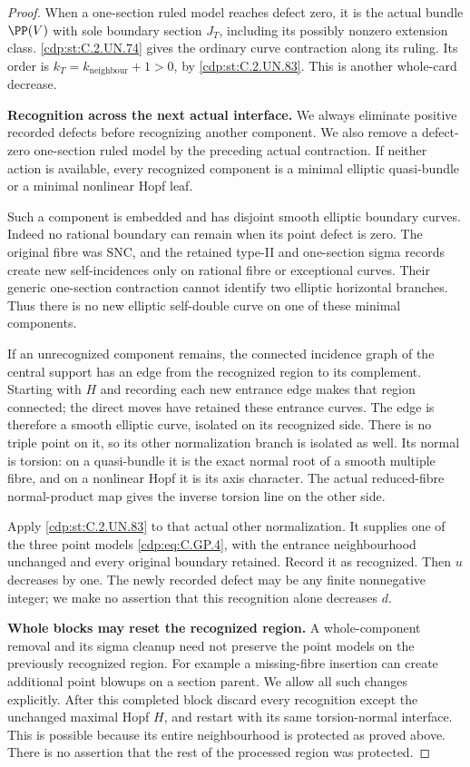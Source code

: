 \begin{proof}
When a one-section ruled model reaches defect
zero, it is the actual bundle \(\PP(V)\)
with sole boundary section \(J_T\), including
its possibly nonzero extension class. \ref{cdp:st:C.2.UN.74}
gives the ordinary curve contraction along
its ruling. Its order is
\(k_T=k_{\mathrm{neighbour}}+1>0\), by \ref{cdp:st:C.2.UN.83}.
This is another whole-card decrease.

\par\medskip\noindent\textbf{Recognition across the next actual interface.}
We always eliminate positive recorded defects
before recognizing another component. We also
remove a defect-zero one-section ruled model
by the preceding actual contraction. If neither
action is available, every recognized component
is a minimal elliptic quasi-bundle or a minimal
nonlinear Hopf leaf.

Such a component is embedded and has disjoint
smooth elliptic boundary curves. Indeed no
rational boundary can remain when its point
defect is zero. The original fibre was SNC,
and the retained type-II and one-section
sigma records create new self-incidences only
on rational fibre or exceptional curves.
Their generic one-section contraction cannot
identify two elliptic horizontal branches.
Thus there is no new elliptic self-double
curve on one of these minimal components.

If an unrecognized component remains, the
connected incidence graph of the central
support has an edge from the recognized
region to its complement. Starting with
\(H\) and recording each new entrance edge
makes that region connected; the direct
moves have retained these entrance curves.
The edge is therefore a smooth elliptic
curve, isolated on its recognized side.
There is no triple point on it, so its
other normalization branch is isolated
as well. Its normal is torsion: on a
quasi-bundle it is the exact normal root
of a smooth multiple fibre, and on a
nonlinear Hopf it is its axis character.
The actual reduced-fibre normal-product
map gives the inverse torsion line on
the other side.

Apply \ref{cdp:st:C.2.UN.83} to that actual other normalization.
It supplies one of the three point models
\eqref{cdp:eq:C.GP.4}, with the entrance neighbourhood
unchanged and every original boundary
retained. Record it as recognized. Then
\(u\) decreases by one. The newly recorded
defect may be any finite nonnegative integer;
we make no assertion that this recognition
alone decreases \(d\).

\par\medskip\noindent\textbf{Whole blocks may reset the recognized region.}
A whole-component removal and its sigma
cleanup need not preserve the point models
on the previously recognized region. For
example a missing-fibre insertion can create
additional point blowups on a section parent.
We allow all such changes explicitly.
After this completed block discard every
recognition except the unchanged maximal
Hopf \(H\), and restart with its same
torsion-normal interface. This is possible
because its entire neighbourhood is protected
as proved above. There is no assertion that
the rest of the processed region was protected.


\end{proof}
